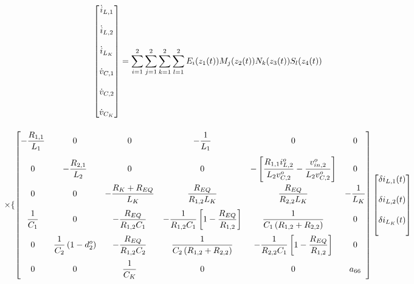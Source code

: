 \begin{gather}
    \begin{bmatrix}
    \dot{i}_{L,1} \\[12pt] \dot{i}_{L,2} \\[12pt] \dot{i}_{L_K} \\[12pt]
    \dot{v}_{C,1} \\[12pt] \dot{v}_{C,2} \\[12pt] \dot{v}_{C_K}
  \end{bmatrix} =
  \sum\limits_{i=1}^{2} \sum\limits_{j=1}^{2} \sum\limits_{k=1}^{2} \sum\limits_{l=1}^{2} E_i(z_1(t))M_j(z_2(t))N_k(z_3(t))S_l(z_4(t))
  \notag \\[12pt] \times
  \{
    \begin{bmatrix}
    \displaystyle - \frac{R_{1,1}}{L_1} & 0                         & 0                                         & \displaystyle - \frac{1}{L_1}                  & 0                                    & 0                           \\[12pt]
    0                         & \displaystyle - \frac{R_{2,1}}{L_2} & 0                                         & 0                                    & \displaystyle - \left[ \frac{R_{1,1} i_{L,2}^o}{L_2 v_{C,2}^o} - \frac{v_{in,2}^o}{L_2 v_{C,2}^o} \right]                  & 0                           \\[12pt]
    0                         & 0                         & - \displaystyle \frac{R_K + R_{EQ}}{L_K}   & \displaystyle \frac{R_{EQ}}{R_{1,2} L_K}              & \displaystyle \frac{R_{EQ}}{R_{2,2} L_K}              & - \displaystyle \frac{1}{L_K}         \\[12pt]
    \displaystyle \frac{1}{C_1}         & 0                         & \displaystyle - \frac{R_{EQ}}{R_{1,2} C_1}                 & \displaystyle - \frac{1}{R_{1,2}C_1} \left[ 1 - \frac{R_{EQ}}{R_{1,2}} \right] & \displaystyle \frac{1}{C_1 \left(R_{1,2} + R_{2,2}\right)}       & 0                           \\[12pt]
    0                         & \displaystyle \frac{1}{C_2} \left( 1 - d_2^o \right)         & \displaystyle - \frac{R_{EQ}}{R_{1,2} C_2} & \displaystyle \frac{1}{C_2 \left(R_{1,2} + R_{2,2}\right)}      & \displaystyle - \frac{1}{R_{2,2}C_1} \left[ 1 - \frac{R_{EQ}}{R_{1,2}} \right] & 0                           \\[12pt]
    0                         & 0                         & \displaystyle \frac{1}{C_K}                         & 0                                    & 0                                    & a_{66}
  \end{bmatrix}
  \begin{bmatrix}
    \delta i_{L,1}(t) \\[12pt] \delta i_{L,2}(t) \\[12pt] \delta i_{L_K}(t) \\[12pt]

\end{bmatrix}
\end{gather}
